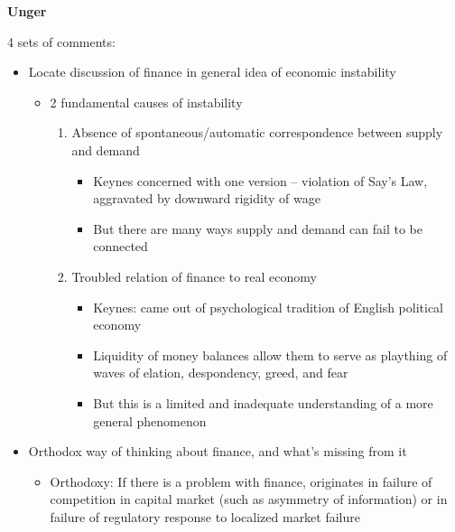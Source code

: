 \textbf{Unger}

4 sets of comments:

\begin{itemize}
\tightlist
\item
  Locate discussion of finance in general idea of economic instability

  \begin{itemize}
  \tightlist
  \item
    2 fundamental causes of instability

    \begin{enumerate}
    \def\labelenumi{\arabic{enumi}.}
    \tightlist
    \item
      Absence of spontaneous/automatic correspondence between supply and
      demand

      \begin{itemize}
      \tightlist
      \item
        Keynes concerned with one version -- violation of Say's Law,
        aggravated by downward rigidity of wage
      \item
        But there are many ways supply and demand can fail to be
        connected
      \end{itemize}
    \item
      Troubled relation of finance to real economy

      \begin{itemize}
      \tightlist
      \item
        Keynes: came out of psychological tradition of English political
        economy
      \item
        Liquidity of money balances allow them to serve as plaything of
        waves of elation, despondency, greed, and fear
      \item
        But this is a limited and inadequate understanding of a more
        general phenomenon
      \end{itemize}
    \end{enumerate}
  \end{itemize}
\item
  Orthodox way of thinking about finance, and what's missing from it

  \begin{itemize}
  \tightlist
  \item
    Orthodoxy: If there is a problem with finance, originates in failure
    of competition in capital market (such as asymmetry of information)
    or in failure of regulatory response to localized market failure


\end{itemize}
\end{itemize}

